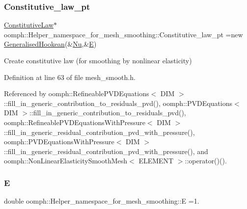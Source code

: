 \subsubsection{\texorpdfstring{Constitutive\+\_\+law\+\_\+pt}{Constitutive\_law\_pt}}
{\footnotesize\ttfamily \hyperlink{classoomph_1_1ConstitutiveLaw}{Constitutive\+Law}$\ast$ oomph\+::\+Helper\+\_\+namespace\+\_\+for\+\_\+mesh\+\_\+smoothing\+::\+Constitutive\+\_\+law\+\_\+pt =new \hyperlink{classoomph_1_1GeneralisedHookean}{Generalised\+Hookean}(\&\hyperlink{namespaceoomph_1_1Helper__namespace__for__mesh__smoothing_a27eabf4a5c7ca88b62dcb3e87462587e}{Nu},\&\hyperlink{namespaceoomph_1_1Helper__namespace__for__mesh__smoothing_a898d8e0f8dc2e672397917061d06fe03}{E})}



Create constitutive law (for smoothing by nonlinear elasticity) 



Definition at line 63 of file mesh\+\_\+smooth.\+h.



Referenced by oomph\+::\+Refineable\+P\+V\+D\+Equations$<$ D\+I\+M $>$\+::fill\+\_\+in\+\_\+generic\+\_\+contribution\+\_\+to\+\_\+residuals\+\_\+pvd(), oomph\+::\+P\+V\+D\+Equations$<$ D\+I\+M $>$\+::fill\+\_\+in\+\_\+generic\+\_\+contribution\+\_\+to\+\_\+residuals\+\_\+pvd(), oomph\+::\+Refineable\+P\+V\+D\+Equations\+With\+Pressure$<$ D\+I\+M $>$\+::fill\+\_\+in\+\_\+generic\+\_\+residual\+\_\+contribution\+\_\+pvd\+\_\+with\+\_\+pressure(), oomph\+::\+P\+V\+D\+Equations\+With\+Pressure$<$ D\+I\+M $>$\+::fill\+\_\+in\+\_\+generic\+\_\+residual\+\_\+contribution\+\_\+pvd\+\_\+with\+\_\+pressure(), and oomph\+::\+Non\+Linear\+Elasticity\+Smooth\+Mesh$<$ E\+L\+E\+M\+E\+N\+T $>$\+::operator()().

\mbox{\label{namespaceoomph_1_1Helper__namespace__for__mesh__smoothing_a898d8e0f8dc2e672397917061d06fe03}} 
\subsubsection{\texorpdfstring{E}{E}}
{\footnotesize\ttfamily double oomph\+::\+Helper\+\_\+namespace\+\_\+for\+\_\+mesh\+\_\+smoothing\+::E =1.}



